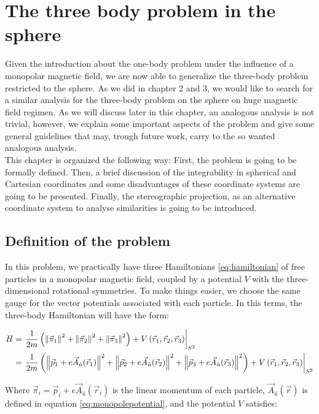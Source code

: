 \chapter{The three body problem in the sphere}
Given the introduction about the one-body problem under the influence of a monopolar magnetic field, we are now able to generalize the three-body problem restricted to the sphere. As we did in chapter 2 and 3, we would like to search for a similar analysis for the three-body problem on the sphere on huge magnetic field regimen. As we will discuss later in this chapter, an analogous analysis is not trivial, however, we explain some important aspects of the problem and give some general guidelines that may, trough future work, carry to the so wanted analogous analysis.\\

This chapter is organized the following way: First, the problem is going to be formally defined. Then, a brief discussion of the integrability in spherical and Cartesian coordinates and some disadvantages of these coordinate systems are going to be presented. Finally, the stereographic projection, as an alternative coordinate system to analyse similarities is going to be introduced.\\

\section{Definition of the problem}
In this problem, we practically have three Hamiltonians \eqref{eq:hamiltonian} of free particles in a monopolar magnetic field, coupled by a potential $V$ with the three-dimensional rotational symmetries. To make things easier, we choose the same gauge for the vector potentials associated with each particle. In this terms, the three-body Hamiltonian will have the form:

\begin{align}
H &= \left. \frac{1}{2m}\left( \left\lVert \vec{\pi}_1 \right\rVert^2+\left\lVert \vec{\pi}_2 \right\rVert^2+\left\lVert \vec{\pi}_3 \right\rVert^2 \right) + V\left( \vec{r}_1,\vec{r}_2,\vec{r}_3 \right)    \right|_{S^2} \nonumber \\
&= \left. \frac{1}{2m}\left( \left\lVert \vec{p}_1+e\vec{A}_{\hat{u}}(\vec{r}_1) \right\rVert^2+\left\lVert \vec{p}_2+e\vec{A}_{\hat{u}}(\vec{r}_2) \right\rVert^2+\left\lVert \vec{p}_3+e\vec{A}_{\hat{u}}(\vec{r}_3) \right\rVert^2 \right) + V\left( \vec{r}_1,\vec{r}_2,\vec{r}_3 \right)    \right|_{S^2}
\label{eq:3sphereHam}
\end{align}

Where $\vec{\pi}_i = \vec{p}_i+e\vec{A}_{\hat{u}}(\vec{r}_i)$ is the linear momentum of each particle,  $\vec{A}_{\hat{u}}(\vec{r})$ is defined in equation \eqref{eq:monopolepotential}, and the potential $V$ satisfies:

